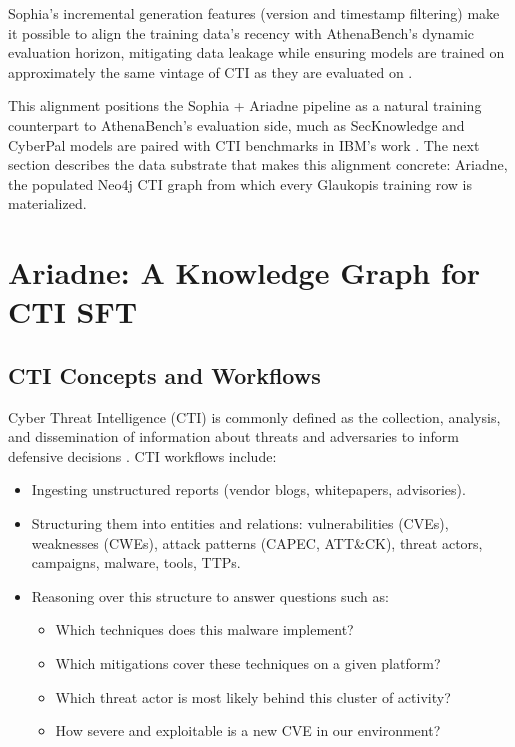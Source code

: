 \documentclass[webpdf,contemporary,large]{oup-authoring-template}
\theoremstyle{thmstyleone}
\theoremstyle{thmstyletwo}
\theoremstyle{thmstylethree}
\begin{document}
Sophia's incremental generation features (version and timestamp filtering) make it possible to align the training data's recency with AthenaBench's dynamic evaluation horizon, mitigating data leakage while ensuring models are trained on approximately the same vintage of CTI as they are evaluated on \cite{cardei2025ift,alam2025athenabench}.

This alignment positions the Sophia + Ariadne pipeline as a natural training counterpart to AthenaBench's evaluation side, much as SecKnowledge and CyberPal models are paired with CTI benchmarks in IBM's work \cite{levi2024cyberpal,levi2025toward}. The next section describes the data substrate that makes this alignment concrete: Ariadne, the populated Neo4j CTI graph from which every Glaukopis training row is materialized.

\section{Ariadne: A Knowledge Graph for CTI SFT}
\label{sec:cti-kg}

\subsection{CTI Concepts and Workflows}

Cyber Threat Intelligence (CTI) is commonly defined as the collection, analysis, and dissemination of information about threats and adversaries to inform defensive decisions \cite{mcmillan2013gartner}. CTI workflows include:

\begin{itemize}
  \item Ingesting unstructured reports (vendor blogs, whitepapers, advisories).
  \item Structuring them into entities and relations: vulnerabilities (CVEs), weaknesses (CWEs), attack patterns (CAPEC, ATT\&CK), threat actors, campaigns, malware, tools, TTPs.
  \item Reasoning over this structure to answer questions such as:
    \begin{itemize}
      \item Which techniques does this malware implement?
      \item Which mitigations cover these techniques on a given platform?
      \item Which threat actor is most likely behind this cluster of activity?
      \item How severe and exploitable is a new CVE in our environment?
    \end{itemize}
\end{itemize}
\end{document}
